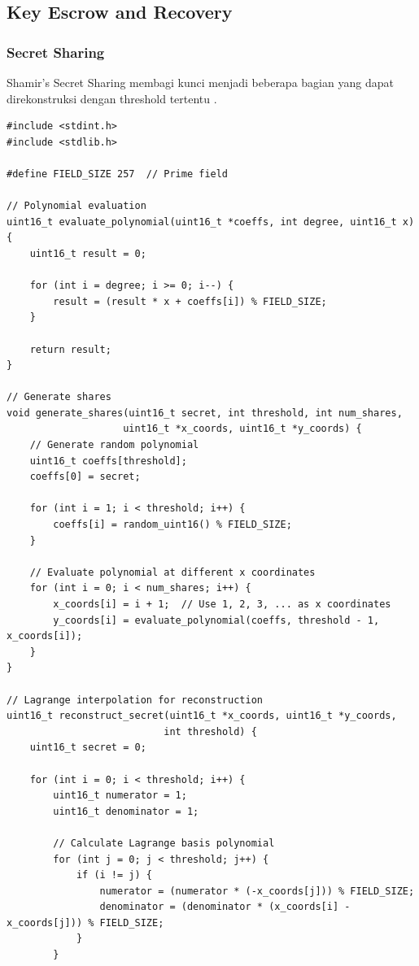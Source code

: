 \subsection{Key Escrow and Recovery}

\subsubsection{Secret Sharing}

Shamir's Secret Sharing membagi kunci menjadi beberapa bagian yang dapat direkonstruksi dengan threshold tertentu \cite{shamir1979}.

\begin{lstlisting}[style=cstyle, caption={Shamir's Secret Sharing}]
#include <stdint.h>
#include <stdlib.h>

#define FIELD_SIZE 257  // Prime field

// Polynomial evaluation
uint16_t evaluate_polynomial(uint16_t *coeffs, int degree, uint16_t x) {
    uint16_t result = 0;
    
    for (int i = degree; i >= 0; i--) {
        result = (result * x + coeffs[i]) % FIELD_SIZE;
    }
    
    return result;
}

// Generate shares
void generate_shares(uint16_t secret, int threshold, int num_shares, 
                    uint16_t *x_coords, uint16_t *y_coords) {
    // Generate random polynomial
    uint16_t coeffs[threshold];
    coeffs[0] = secret;
    
    for (int i = 1; i < threshold; i++) {
        coeffs[i] = random_uint16() % FIELD_SIZE;
    }
    
    // Evaluate polynomial at different x coordinates
    for (int i = 0; i < num_shares; i++) {
        x_coords[i] = i + 1;  // Use 1, 2, 3, ... as x coordinates
        y_coords[i] = evaluate_polynomial(coeffs, threshold - 1, x_coords[i]);
    }
}

// Lagrange interpolation for reconstruction
uint16_t reconstruct_secret(uint16_t *x_coords, uint16_t *y_coords, 
                           int threshold) {
    uint16_t secret = 0;
    
    for (int i = 0; i < threshold; i++) {
        uint16_t numerator = 1;
        uint16_t denominator = 1;
        
        // Calculate Lagrange basis polynomial
        for (int j = 0; j < threshold; j++) {
            if (i != j) {
                numerator = (numerator * (-x_coords[j])) % FIELD_SIZE;
                denominator = (denominator * (x_coords[i] - x_coords[j])) % FIELD_SIZE;
            }
        }
        

\end{lstlisting}
